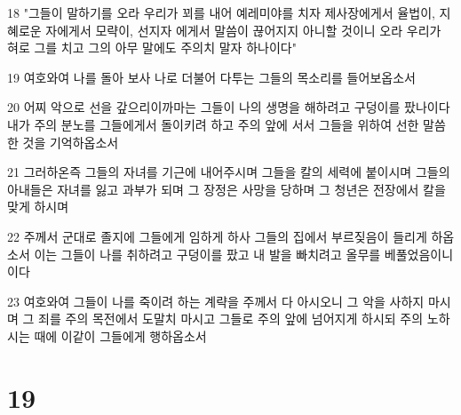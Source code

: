 \par 18 "그들이 말하기를 오라 우리가 꾀를 내어 예레미야를 치자 제사장에게서 율법이, 지혜로운 자에게서 모략이, 선지자 에게서 말씀이 끊어지지 아니할 것이니 오라 우리가 혀로 그를 치고 그의 아무 말에도 주의치 말자 하나이다"
\par 19 여호와여 나를 돌아 보사 나로 더불어 다투는 그들의 목소리를 들어보옵소서
\par 20 어찌 악으로 선을 갚으리이까마는 그들이 나의 생명을 해하려고 구덩이를 팠나이다 내가 주의 분노를 그들에게서 돌이키려 하고 주의 앞에 서서 그들을 위하여 선한 말씀한 것을 기억하옵소서
\par 21 그러하온즉 그들의 자녀를 기근에 내어주시며 그들을 칼의 세력에 붙이시며 그들의 아내들은 자녀를 잃고 과부가 되며 그 장정은 사망을 당하며 그 청년은 전장에서 칼을 맞게 하시며
\par 22 주께서 군대로 졸지에 그들에게 임하게 하사 그들의 집에서 부르짖음이 들리게 하옵소서 이는 그들이 나를 취하려고 구덩이를 팠고 내 발을 빠치려고 올무를 베풀었음이니이다
\par 23 여호와여 그들이 나를 죽이려 하는 계략을 주께서 다 아시오니 그 악을 사하지 마시며 그 죄를 주의 목전에서 도말치 마시고 그들로 주의 앞에 넘어지게 하시되 주의 노하시는 때에 이같이 그들에게 행하옵소서

\chapter{19}


